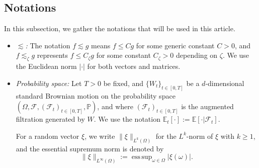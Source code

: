 \documentclass[11pt,reqno]{amsart}
\DeclareMathOperator*{\esssup}{ess\,sup}
\numberwithin{equation}{section}
\begin{document}
\subsection{Notations}\label{sec:preliminaries} In this subsection, we gather the notations that will be used in this article. 

\begin{itemize}
  
\item {\it $\lesssim$:} The notation $f\lesssim g$ means $f\le Cg$ for some generic constant $C>0$, and $f \lesssim_{\zeta} g$ represents $f \le C_{\zeta} g$ for some constant $C_{\zeta}>0$ depending on $\zeta$. We use the Euclidean norm  $|\cdot|$ for both vectors and matrices.\\

\item {\it Probability space:} 
Let $T>0$ be fixed, and $\{W_t\}_{t\in[0,T]}$ be a $d$-dimensional standard
Brownian motion on the probability space $(\Omega,\mathcal{F},(\mathcal{F}_{t})_{t\in[0,T]}, \mathbb{P})$, and where $(\mathcal{F}_{t})_{t\in[0,T]}$ is the augmented filtration generated by $W$. We use the notation $\mathbb{E}_{t}[\cdot]:=\mathbb{E}\left[\cdot|\mathcal{F}_t\right]$.

 
For a  random vector $\xi$, we write $\|\xi\|_{L^{k}(\Omega)}$ for the $L^{k}$-norm of $\xi$ with $k\ge 1$, and the essential supremum norm is  denoted by		\begin{equation*}			
\|\xi\|_{L^{\infty}(\Omega)}:=\esssup_{\omega\in\Omega}|\xi(\omega)|. 
\end{equation*}


\end{itemize}
\end{document}
